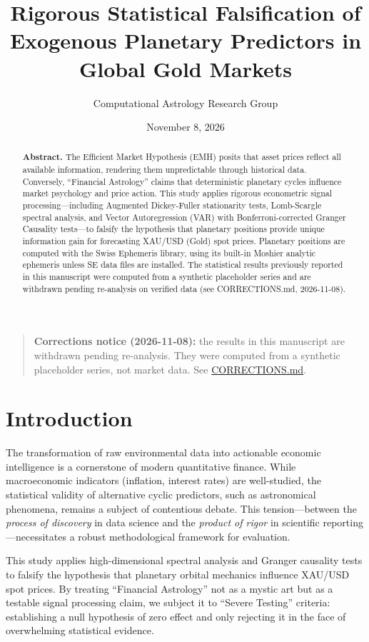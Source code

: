 \documentclass[
  american,
  11pt,
  a4paper,
  oneside,
  openany]{article}
\title{Rigorous Statistical Falsification of Exogenous Planetary
Predictors in Global Gold Markets}
\author{Computational Astrology Research Group}
\date{November 8, 2026}
\begin{document}
\maketitle
\begin{abstract}
\textbf{Abstract.} The Efficient Market Hypothesis (EMH) posits that
asset prices reflect all available information, rendering them
unpredictable through historical data. Conversely, ``Financial
Astrology'' claims that deterministic planetary cycles influence market
psychology and price action. This study applies rigorous econometric
signal processing---including Augmented Dickey-Fuller stationarity
tests, Lomb-Scargle spectral analysis, and Vector Autoregression (VAR)
with Bonferroni-corrected Granger Causality tests---to falsify the
hypothesis that planetary positions provide unique information gain for
forecasting XAU/USD (Gold) spot prices. Planetary positions are computed
with the Swiss Ephemeris library, using its built-in Moshier analytic
ephemeris unless SE data files are installed. The statistical results
previously reported in this manuscript were computed from a synthetic
placeholder series and are withdrawn pending re-analysis on verified
data (see CORRECTIONS.md, 2026-11-08).
\end{abstract}


\begin{quote}
\textbf{Corrections notice (2026-11-08):} the results in this manuscript
are withdrawn pending re-analysis. They were computed from a synthetic
placeholder series, not market data. See
\href{../../CORRECTIONS.md}{CORRECTIONS.md}.
\end{quote}

\section{Introduction}\label{introduction}

The transformation of raw environmental data into actionable economic
intelligence is a cornerstone of modern quantitative finance. While
macroeconomic indicators (inflation, interest rates) are well-studied,
the statistical validity of alternative cyclic predictors, such as
astronomical phenomena, remains a subject of contentious debate. This
tension---between the \emph{process of discovery} in data science and
the \emph{product of rigor} in scientific reporting---necessitates a
robust methodological framework for evaluation.

This study applies high-dimensional spectral analysis and Granger
causality tests to falsify the hypothesis that planetary orbital
mechanics influence XAU/USD spot prices. By treating ``Financial
Astrology'' not as a mystic art but as a testable signal processing
claim, we subject it to ``Severe Testing'' criteria: establishing a null
hypothesis of zero effect and only rejecting it in the face of
overwhelming statistical evidence.
\end{document}
